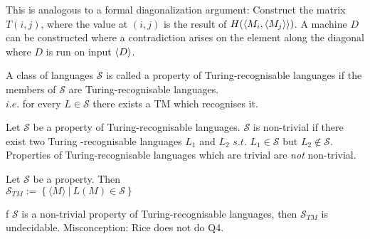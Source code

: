 {This is analogous to a formal diagonalization argument: Construct the matrix $T(i,j)$, where the value at $(i, j)$ is the result of $H(\langle{M_i, \langle{M_j}\rangle}\rangle)$. A machine $D$ can be constructed where a contradiction arises on the element along the diagonal where $D$ is run on input $\langle{D}\rangle$.














}

\begin{definition}
A class of languages $\mathcal{S}$ is called a property of Turing-recognisable languages if the members of $\mathcal{S}$ are Turing-recognisable languages. \\ $i.e.$ for every $L \in \mathcal{S}$ there exists a TM which recognises it. 
\end{definition}

\begin{definition}
Let $\mathcal{S}$ be a property of Turing-recognisable languages. $\mathcal{S}$ is non-trivial if there exist two Turing -recognisable languages $L_{1}$ and $L_{2}$ $s.t.$ $L_{1} \in \mathcal{S}$ but $L_{2} \notin \mathcal{S}$. Properties of Turing-recognisable languages which are trivial are \emph{not} non-trivial. 

\end{definition}






\begin{definition}[$\mathcal{S}_{TM}$]
Let $\mathcal{S}$ be a property. Then 
\\
$\mathcal{S}_{TM} :=\left\{ \langle M\rangle \  |\  L\left( M\right)  \in \mathcal{S} \right\}  $
\end{definition}

\begin{theorem}
f $\mathcal{S}$ is a non-trivial property of Turing-recognisable languages, then $\mathcal{S}_{TM}$ is undecidable.
Misconception: Rice does not do Q4.
\end{theorem}